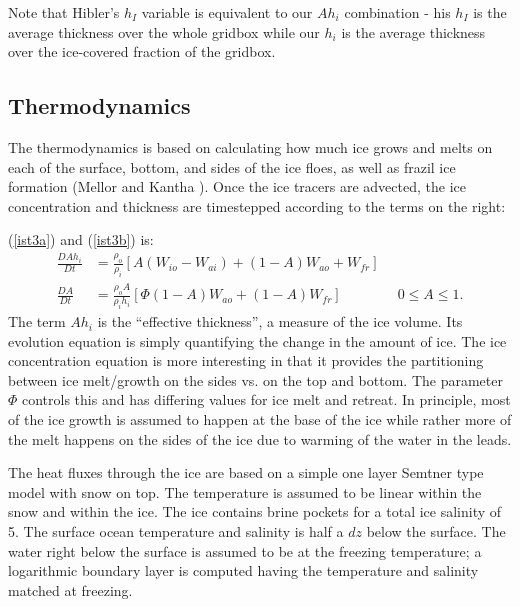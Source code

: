 Note that Hibler's $h_I$ variable is equivalent to our $A h_i$
combination - his $h_I$ is the average thickness over the whole
gridbox while our $h_i$ is the average thickness over the ice-covered
fraction of the gridbox. 

\subsection{Thermodynamics}
\label{Growth}

The thermodynamics is based on calculating how much ice grows and
melts on each of the surface, bottom, and sides of the ice floes,
as well as frazil ice formation (Mellor and Kantha \cite{Mellor89}).
Once the ice tracers are advected, the ice concentration and
thickness are timestepped according to the terms on the right:

(\ref{ist3a}) and (\ref{ist3b}) is:
\begin{align}
  \frac{D A h_i }{D t}
  & = \frac{\rho_o }{ \rho_i} \left[ A (W_{io} - W_{ai}) + (1-A) W_{ao}
  + W_{fr} \right]
\label{ist4a} \\
  \frac{D A }{ D t}
  & = \frac{\rho_o A }{ \rho_i h_i} \left[ \Phi (1-A) W_{ao} + (1-A)
  W_{fr} \right] \qquad \qquad 0 \leq A \leq 1 .
\label{ist4b}
\end{align}
The term $Ah_i$ is the ``effective thickness'', a measure of the ice
volume. Its evolution equation is simply quantifying the change in
the amount of ice. The ice concentration equation is more interesting in
that it provides the partitioning between ice melt/growth on the sides
vs. on the top and bottom. The parameter $\Phi$ controls this and has
differing values for ice melt and retreat. In principle, most of the ice
growth is assumed to happen at the base of the ice while rather more of
the melt happens on the sides of the ice due to warming of the water in
the leads.

The heat fluxes through the ice are based on a simple one layer
Semtner \cite{Semtner76a} type model with
snow on top. The temperature is assumed to be linear within the snow
and within the ice. The ice contains brine pockets for a
total ice salinity of 5. The surface ocean temperature and salinity
is half a $dz$ below the surface. The water right below the surface
is assumed to be at the freezing temperature; a logarithmic boundary
layer is computed having the temperature and salinity matched at
freezing.


